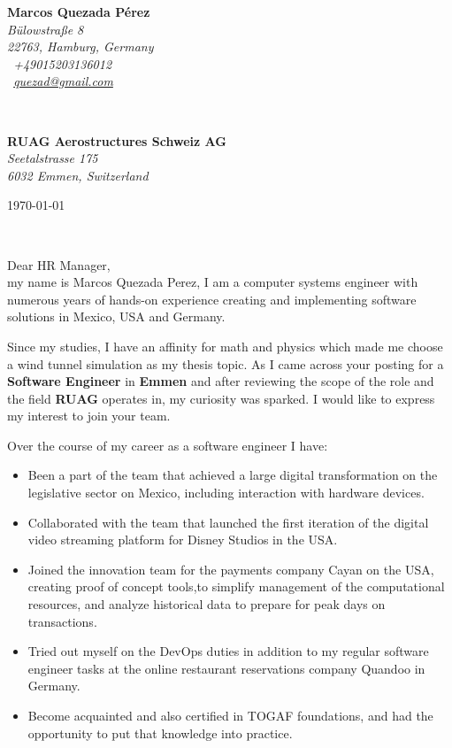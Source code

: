 \documentclass[a4paper,nonstopmode,9.5pt]{article}
\renewcommand{\sffamily}{\rmfamily}
\begin{document}
\sffamily   %
\hfill%
\begin{minipage}[t]{.6\textwidth}
\raggedleft%
{\bfseries Marcos Quezada Pérez}\\[.35ex]
\small\itshape%
Bülowstraße 8\\
22763, Hamburg, Germany\\[.35ex]
\Telefon~+49015203136012\\
\Letter~\href{mailto:quezad@gmail.com}{quezad@gmail.com}
\end{minipage}\\[1em]
%
\begin{minipage}[t]{.4\textwidth}
\raggedright%
{\bfseries RUAG Aerostructures Schweiz AG}\\[.35ex]
\small\itshape%
Seetalstrasse 175\\
6032 Emmen, Switzerland
\end{minipage}
\hfill %
\begin{minipage}[t]{.4\textwidth}
\raggedleft %
\today
\end{minipage}\\[2em]
\raggedright
Dear HR Manager,\\[1.5em]
%
my name is Marcos Quezada Perez, I am a computer systems engineer with numerous years of hands-on experience creating and implementing software solutions in Mexico, USA and Germany. 

Since my studies, I have an affinity for math and physics which made me choose a wind tunnel simulation as my thesis topic. As I came across your posting for a \textbf{Software Engineer} in \textbf{Emmen}
and after reviewing the scope of the role and the field \textbf{RUAG} operates in, my curiosity was sparked. I would like to express my interest to join your team.

Over the course of my career as a software engineer I have:
\begin{itemize}
    \item[\Laserbeam] Been a part of the team that achieved a large digital transformation on the legislative sector on Mexico, including interaction with hardware devices.
    \item[\Laserbeam] Collaborated with the team that launched the first iteration of the digital video streaming platform for Disney Studios in the USA.
    \item[\Laserbeam] Joined the innovation team for the payments company Cayan on the USA, creating proof of concept tools,to simplify management of the computational resources, and analyze historical data to prepare for peak days on transactions.
    \item[\Laserbeam] Tried out myself on the DevOps duties in addition to my regular software engineer tasks at the online restaurant reservations company Quandoo in Germany.
    \item[\Laserbeam] Become acquainted and also certified in TOGAF foundations, and had the opportunity to put that knowledge into practice.
\end{itemize}
\end{document}
